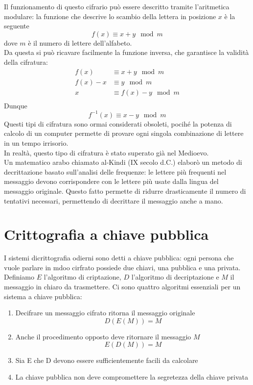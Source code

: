 \documentclass[italian,A4,12pt]{article}
\begin{document}
    Il funzionamento di questo cifrario può essere descritto tramite l'aritmetica modulare: la funzione che descrive lo scambio della lettera in posizione $x$ è la seguente
    $$f(x)\equiv x+y \mod{m}$$
    dove $m$ è il numero di lettere dell'alfabeto.\\
    Da questa si può ricavare facilmente la funzione inversa, che garantisce la validità della cifratura:
    \begin{align*}
      f(x) & \equiv x+y \mod{m}\\
      f(x)-x & \equiv y \mod{m}\\
      x & \equiv f(x)-y \mod{m}\\
    \end{align*}
    Dunque
    $$f^{-1}(x)\equiv x-y \mod{m}$$
    Questi tipi di cifratura sono ormai considerati obsoleti, pocihé la potenza di calcolo di un computer permette di provare ogni singola combinazione di lettere in un tempo irrisorio.\\
    In realtà, questo tipo di cifratura è stato superato già nel Medioevo. \\ Un matematico arabo chiamato al-Kindi (IX secolo d.C.) elaborò un metodo di decrittazione basato sull'analisi delle frequenze: le lettere più frequenti nel messaggio devono corrispondere con le lettere più usate dalla lingua del messaggio originale. Questo fatto permette di ridurre drasticamente il numero di tentativi necessari, permettendo di decrittare il messaggio anche a mano.
    \newpage
  \section{Crittografia a chiave pubblica}
    I sistemi dicrittografia odierni sono detti a chiave pubblica: ogni persona che vuole parlare in mdoo cirfrato possiede due chiavi, una pubblica e una privata.\\
    Definiamo $E$ l'algoritmo di criptazione, $D$ l'algoritmo di decriptazione e $M$ il messaggio in chiaro da trasmettere. Ci sono quattro algoritmi essenziali per un sistema a chiave pubblica:
    \begin{enumerate}[label=(\alph*)]
      \item Decifrare un messaggio cifrato ritorna il messaggio originale $$D(E(M))=M$$
      \item Anche il procedimento opposto deve ritornare il messaggio $M$ $$E(D(M))=M$$
      \item Sia E che D devono essere sufficientemente facili da calcolare
      \item La chiave pubblica non deve compromettere la segretezza della chiave privata
    \end{enumerate}
\end{document}

